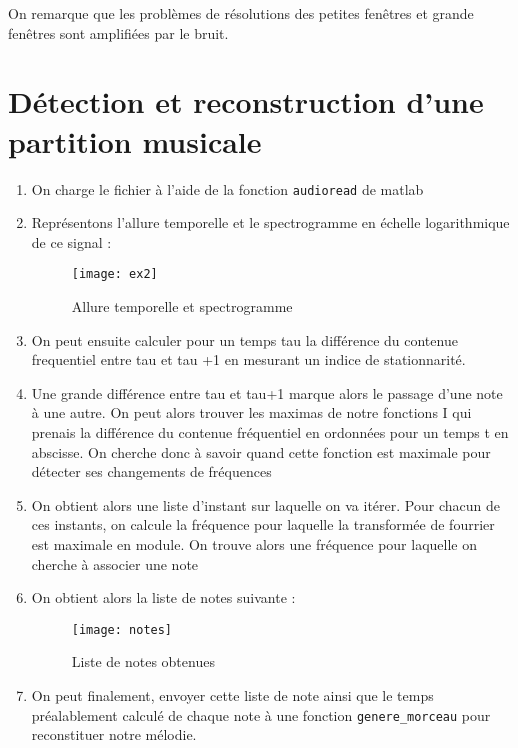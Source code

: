\documentclass[12pt,a4paper,titlepage]{article}
\begin{document}
On remarque que les problèmes de résolutions des petites fenêtres et grande fenêtres sont amplifiées par le bruit.
\pagebreak

\section{Détection et reconstruction d'une partition musicale}

\begin{enumerate}

    \item{On charge le fichier à l'aide de la fonction \texttt{audioread} de matlab}

    \item{Représentons l'allure temporelle et le spectrogramme en échelle logarithmique de ce signal :
	\begin{figure}[H]
   		\caption{Allure temporelle et spectrogramme }
        \texttt{[image: ex2]}
        \centering
    \end{figure}
        }

    \item{On peut ensuite calculer pour un temps tau la différence du contenue frequentiel entre tau et tau +1 en mesurant un indice de stationnarité.}

    \item{Une grande différence entre tau et tau+1 marque alors le passage d'une note à une autre. On peut alors trouver les maximas de notre fonctions I qui prenais la différence du contenue fréquentiel en ordonnées pour un temps t en abscisse. On cherche donc à savoir quand cette fonction est maximale pour détecter ses changements de fréquences }

    \item{On obtient alors une liste d'instant sur laquelle on va itérer. Pour chacun de ces instants, on calcule la fréquence pour laquelle la transformée de fourrier est maximale en module. On trouve alors une fréquence pour laquelle on cherche à associer une note}
    
    \item{On obtient alors la liste de notes suivante :
    \begin{figure}[H]
    	\caption{Liste de notes obtenues}
    	\texttt{[image: notes]}
        \centering
    \end{figure}}
    
\item{On peut finalement, envoyer cette liste de note ainsi que le temps préalablement calculé de chaque note à une fonction \texttt{genere\_morceau} pour reconstituer notre mélodie.}

\end{enumerate}
\end{document}
